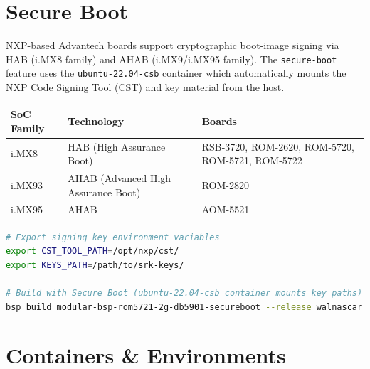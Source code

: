 \documentclass[a4paper,11pt]{article}
\begin{document}
\section{Secure Boot}

NXP-based Advantech boards support cryptographic boot-image signing via HAB
(i.MX8 family) and AHAB (i.MX9/i.MX95 family). The \texttt{secure-boot}
feature uses the \texttt{ubuntu-22.04-csb} container which automatically mounts
the NXP Code Signing Tool (CST) and key material from the host.

\begin{tabularx}{\linewidth}{L{22mm}L{56mm}X}
  \textbf{SoC Family} & \textbf{Technology} & \textbf{Boards} \\
  \toprule
   i.MX8  & HAB (High Assurance Boot)           & RSB-3720, ROM-2620, ROM-5720, ROM-5721, ROM-5722 \\
    i.MX93 & AHAB (Advanced High Assurance Boot) & ROM-2820 \\
   i.MX95 & AHAB                                & AOM-5521 \\
  \bottomrule
\end{tabularx}

\begin{lstlisting}[language=Bash]
# Export signing key environment variables
export CST_TOOL_PATH=/opt/nxp/cst/
export KEYS_PATH=/path/to/srk-keys/

# Build with Secure Boot (ubuntu-22.04-csb container mounts key paths)
bsp build modular-bsp-rom5721-2g-db5901-secureboot --release walnascar
\end{lstlisting}

\section{Containers \& Environments}
\end{document}
